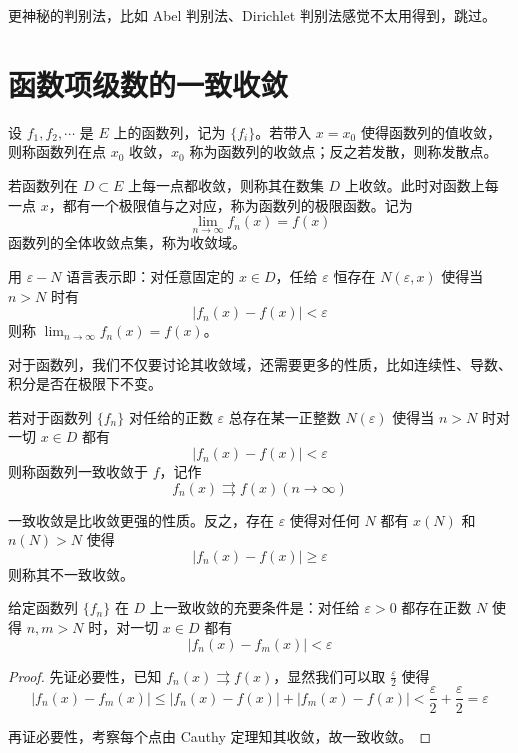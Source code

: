 更神秘的判别法，比如 Abel 判别法、Dirichlet 判别法感觉不太用得到，跳过。


\section{函数项级数的一致收敛}

设 $f_1, f_2, \cdots$ 是 $E$ 上的函数列，记为 $\{f_i\}$。若带入 $x = x_0$ 使得函数列的值收敛，则称函数列在点 $x_0$ 收敛，$x_0$ 称为函数列的收敛点；反之若发散，则称发散点。

若函数列在 $D \subset E$ 上每一点都收敛，则称其在数集 $D$ 上收敛。此时对函数上每一点 $x$，都有一个极限值与之对应，称为函数列的极限函数。记为
\[ \lim_{n \to \infty} f_n(x) = f(x) \]
函数列的全体收敛点集，称为收敛域。

用 $\varepsilon - N$ 语言表示即：对任意固定的 $x \in D$，任给 $\varepsilon$ 恒存在 $N(\varepsilon, x)$ 使得当 $n > N$ 时有
\[ | f_n(x) - f(x) | < \varepsilon \]
则称 $\lim_{n \to \infty} f_n(x) = f(x)$。

对于函数列，我们不仅要讨论其收敛域，还需要更多的性质，比如连续性、导数、积分是否在极限下不变。

\begin{definition}
	若对于函数列 $\{f_n\}$ 对任给的正数 $\varepsilon$ 总存在某一正整数 $N(\varepsilon)$ 使得当 $n > N$ 时对一切 $x \in D$ 都有
	\[ |f_n(x) - f(x)| < \varepsilon \]
	则称函数列一致收敛于 $f$，记作
	\[ f_n(x) \rightrightarrows f(x) (n \to \infty) \]
\end{definition}

一致收敛是比收敛更强的性质。反之，存在 $\varepsilon$ 使得对任何 $N$ 都有 $x(N)$ 和 $n(N) > N$ 使得
\[ |f_n(x) - f(x) | \geqslant \varepsilon \]
则称其不一致收敛。

\begin{theorem}
	给定函数列 $\{f_n\}$ 在 $D$ 上一致收敛的充要条件是：对任给 $\varepsilon > 0$ 都存在正数 $N$ 使得 $n, m > N$ 时，对一切 $x \in D$ 都有
	\[ |f_n(x) - f_m(x) | < \varepsilon \]
\end{theorem}

\begin{proof}
	先证必要性，已知 $f_n(x) \rightrightarrows f(x)$，显然我们可以取 $\frac{\varepsilon}{2}$ 使得
	\[ |f_n(x) - f_m(x)| \leqslant |f_n(x) - f(x)| + |f_m(x) - f(x)| < \frac{\varepsilon}{2} + \frac{\varepsilon}{2} = \varepsilon \]

	再证必要性，考察每个点由 Cauthy 定理知其收敛，故一致收敛。
\end{proof}


